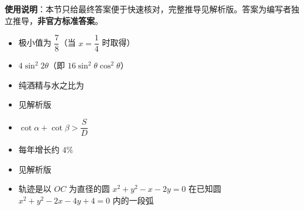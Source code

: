 
\begin{gknotice}
\textbf{使用说明}：本节只给最终答案便于快速核对，完整推导见解析版。答案为编写者独立推导，\textbf{非官方标准答案}。
\end{gknotice}

\begin{itemize}[leftmargin=2.6em]
  \item[\textbf{1.}] 极小值为 $\dfrac78$（当 $x=\dfrac14$ 时取得）
  \item[\textbf{2.}] $4\sin^2 2\theta$（即 $16\sin^2\theta\cos^2\theta$）
  \item[\textbf{3.}] 纯酒精与水之比为
  \item[\textbf{4.}] 见解析版
  \item[\textbf{5.}] $\cot\alpha+\cot\beta>\dfrac SD$
  \item[\textbf{6.}] 每年增长约 $4\%$
  \item[\textbf{7.}] 见解析版
  \item[\textbf{8.}] 轨迹是以 $OC$ 为直径的圆 $x^2+y^2-x-2y=0$ 在已知圆 $x^2+y^2-2x-4y+4=0$ 内的一段弧
\end{itemize}
